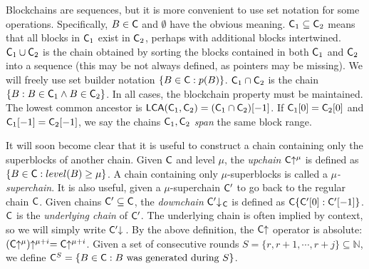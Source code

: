 Blockchains are sequences, but it is more convenient to use set notation for
some operations. Specifically, $B \in \mathsf{C}$ and $\emptyset$ have the obvious
meaning. $\mathsf{C}_1 \subseteq \mathsf{C}_2$ means that all blocks in $\mathsf{C}_1$ exist
in $\mathsf{C}_2$, perhaps with additional blocks intertwined. $\mathsf{C}_1 \cup
\mathsf{C}_2$ is the chain obtained by sorting the blocks contained in both
$\mathsf{C}_1$ and $\mathsf{C}_2$ into a sequence (this may be not always defined, as
pointers may be missing). We will freely use set builder notation $\{B \in
\mathsf{C}: p(B)\}$. $\mathsf{C}_1 \cap \mathsf{C}_2$ is the chain $\{B: B \in \mathsf{C}_1
\land B \in \mathsf{C}_2\}$. In all cases, the blockchain property must be
maintained. The lowest common ancestor is $\textsf{LCA}(\mathsf{C}_1, \mathsf{C}_2) =
(\mathsf{C}_1 \cap \mathsf{C}_2)[-1]$. If $\mathsf{C}_1[0] = \mathsf{C}_2[0]$ and $\mathsf{C}_1[-1]
= \mathsf{C}_2[-1]$, we say the chains $\mathsf{C}_1, \mathsf{C}_2$ \emph{span} the same
block range.

It will soon become clear that it is useful to construct a chain containing only
the superblocks of another chain. Given $\mathsf{C}$ and level $\mu$, the
\emph{upchain} $\mathsf{C}\negthickspace\uparrow^\mu$ is defined as $\{B \in \mathsf{C}: level(B)
\geq \mu\}$. A chain containing only $\mu$-superblocks is called a
$\mu$\emph{-superchain}. It is also useful, given a $\mu$-superchain $\mathsf{C}'$
to go back to the regular chain $\mathsf{C}$. Given chains $\mathsf{C}' \subseteq
\mathsf{C}$, the \emph{downchain} $\mathsf{C}'\negthickspace\downarrow\,\!\!_{\mathsf{C}}$ is defined as
$\mathsf{C}\{\mathsf{C}'[0]:\mathsf{C}'[-1]\}$. $\mathsf{C}$ is the \emph{underlying chain} of
$\mathsf{C}'$. The underlying chain is often implied by context, so we will simply
write $\mathsf{C}'\negthickspace\downarrow\,$. By the above definition, the $\mathsf{C}\negthickspace\uparrow$
operator is absolute: $(\mathsf{C}\negthickspace\uparrow^\mu)\negthickspace\uparrow^{\mu + i} =
\mathsf{C}\negthickspace\uparrow^{\mu + i}$. Given a set of consecutive rounds $S = \{r, r + 1,
\cdots, r + j\} \subseteq \mathbb{N}$, we define $\mathsf{C}^S = \{B \in \mathsf{C}: B
\text{ was generated during } S\}$.
